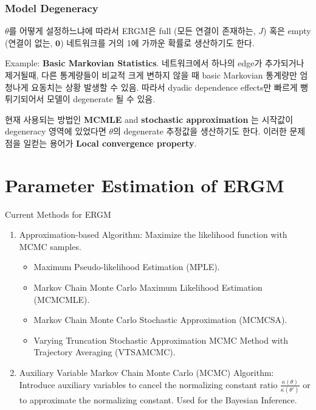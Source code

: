 \documentclass[
]{book}
\providecommand{\tightlist}{%
  \setlength{\itemsep}{0pt}\setlength{\parskip}{0pt}}
\begin{document}
{{{\hypertarget{model-degeneracy}{%
\subsubsection{Model Degeneracy}\label{model-degeneracy}}

\(\theta\)를 어떻게 설정하느냐에 따라서 ERGM은 full (모든 연결이 존재하는, \(J\)) 혹은 empty (연결이 없는, \(\mathbf 0\)) 네트워크를 거의 1에 가까운 확률로 생산하기도 한다.

Example: \textbf{Basic Markovian Statistics}. 네트워크에서 하나의 edge가 추가되거나 제거될때, 다른 통계량들이 비교적 크게 변하지 않을 때 basic Markovian 통계량만 엄청나게 요동치는 상황 발생할 수 있음. 따라서 dyadic dependence effects만 빠르게 뻥튀기되어서 모델이 degenerate 될 수 있음.

현재 사용되는 방법인 \textbf{MCMLE} and \textbf{stochastic approximation} 는 시작값이 degeneracy 영역에 있었다면 \(\theta\)의 degenerate 추정값을 생산하기도 한다. 이러한 문제점을 일컫는 용어가 \textbf{Local convergence property}.

\hypertarget{parameter-estimation-of-ergm}{%
\section{Parameter Estimation of ERGM}\label{parameter-estimation-of-ergm}}

Current Methods for ERGM

\begin{enumerate}
\def\labelenumi{\arabic{enumi}.}
\tightlist
\item
  Approximation-based Algorithm: Maximize the likelihood function with MCMC samples.

  \begin{itemize}
  \tightlist
  \item
    Maximum Pseudo-likelihood Estimation (MPLE).
  \item
    Markov Chain Monte Carlo Maximum Likelihood Estimation (MCMCMLE).
  \item
    Markov Chain Monte Carlo Stochastic Approximation (MCMCSA).
  \item
    Varying Truncation Stochastic Approximation MCMC Method with Trajectory Averaging (VTSAMCMC).
  \end{itemize}
\item
  Auxiliary Variable Markov Chain Monte Carlo (MCMC) Algorithm: Introduce auxiliary variables to cancel the normalizing constant ratio \(\frac{\kappa(\theta)} {\kappa(\theta')}\) or to approximate the normalizing constant. Used for the Bayesian Inference.


\end{enumerate}}}}
\end{document}

